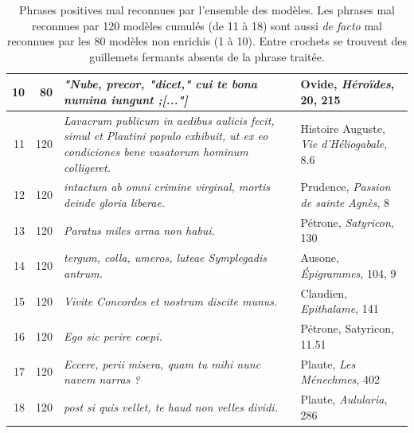 \begin{table}[]
\begin{tabularx}{.9\textwidth}{|r|r|X|X|}
    10    & 80               & \textit{"Nube, precor, "dicet," cui te bona numina iungunt ;{[..."]}}    & Ovide, \textit{Héroïdes}, 20, 215                                                                            \\ \midrule
    11    & 120              & \textit{Lavacrum publicum in aedibus aulicis fecit, simul et Plautini populo exhibuit, ut ex eo condiciones bene vasatorum hominum colligeret.} & Histoire Auguste, \textit{Vie d'Héliogabale}, 8.6 \\
    12    & 120              & \textit{intactum ab omni crimine virginal, mortis deinde gloria liberae.} & Prudence, \textit{Passion de sainte Agnès}, 8                                                                       \\
    13    & 120              & \textit{Paratus miles arma non habui.} & Pétrone, \textit{Satyricon}, 130                                                                                        \\
    14    & 120              & \textit{tergum, colla, umeros, luteae Symplegadis antrum.} & Ausone, \textit{Épigrammes}, 104, 9                                                                                    \\
    15    & 120              & \textit{Vivite Concordes et nostrum discite munus.} & Claudien, \textit{Epithalame}, 141                                                                                              \\
    16    & 120              & \textit{Ego sic perire coepi.} & Pétrone, Satyricon, 11.51                                                                                                                   \\
    17    & 120              & \textit{Eccere, perii misera, quam tu mihi nunc navem narras ?} & Plaute, \textit{Les Ménechmes}, 402                                                                                 \\
    18    & 120              & \textit{post si quis vellet, te haud non velles dividi.} & Plaute, \textit{Aulularia}, 286                                                                                        \\ \bottomrule
    \end{tabularx}
    \caption{Phrases positives mal reconnues par l'ensemble des modèles. Les phrases mal reconnues par 120 modèles cumulés (de 11 à 18) sont aussi \textit{de facto} mal reconnues par les 80 modèles non enrichis  (1 à 10). Entre crochets se trouvent des guillemets fermants absents de la phrase traitée.}
    \label{tab:chap4:erreurscommunes}
\end{table}

